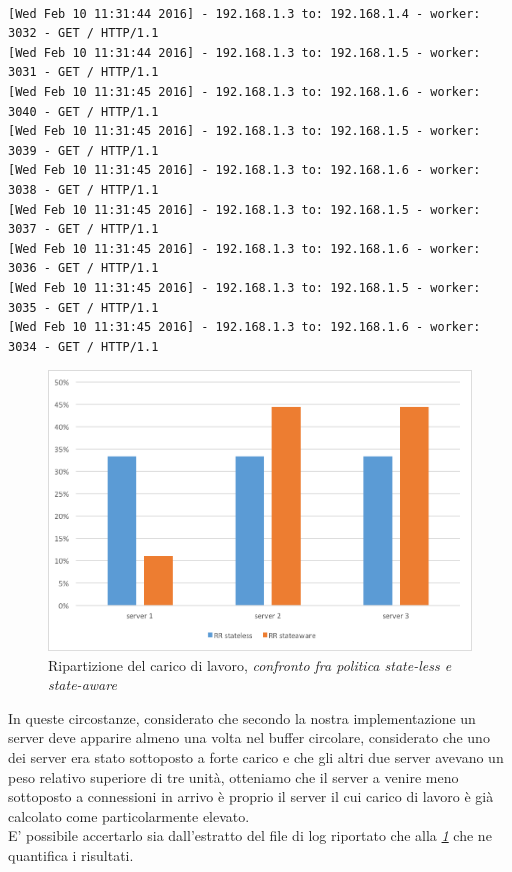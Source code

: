\documentclass[italian]{tktltiki2}
\begin{document}
\begin{lstlisting}[basicstyle=\fontsize{6.4}{7}\selectfont\ttfamily]

[Wed Feb 10 11:31:44 2016] - 192.168.1.3 to: 192.168.1.4 - worker: 3032 - GET / HTTP/1.1
[Wed Feb 10 11:31:44 2016] - 192.168.1.3 to: 192.168.1.5 - worker: 3031 - GET / HTTP/1.1
[Wed Feb 10 11:31:45 2016] - 192.168.1.3 to: 192.168.1.6 - worker: 3040 - GET / HTTP/1.1
[Wed Feb 10 11:31:45 2016] - 192.168.1.3 to: 192.168.1.5 - worker: 3039 - GET / HTTP/1.1
[Wed Feb 10 11:31:45 2016] - 192.168.1.3 to: 192.168.1.6 - worker: 3038 - GET / HTTP/1.1
[Wed Feb 10 11:31:45 2016] - 192.168.1.3 to: 192.168.1.5 - worker: 3037 - GET / HTTP/1.1
[Wed Feb 10 11:31:45 2016] - 192.168.1.3 to: 192.168.1.6 - worker: 3036 - GET / HTTP/1.1
[Wed Feb 10 11:31:45 2016] - 192.168.1.3 to: 192.168.1.5 - worker: 3035 - GET / HTTP/1.1
[Wed Feb 10 11:31:45 2016] - 192.168.1.3 to: 192.168.1.6 - worker: 3034 - GET / HTTP/1.1
\end{lstlisting}
\begin{figure}[H]
\centering
\includegraphics[width=\textwidth]{images/round_robin_cfr}
\caption{Ripartizione del carico di lavoro, \emph{confronto fra politica state-less e state-aware}\label{fig: rrobin_cfr}}
\end{figure}
In queste circostanze, considerato che secondo la nostra implementazione un server deve apparire almeno una volta nel buffer circolare, considerato che uno dei server era stato sottoposto a forte carico e che gli altri due server avevano un peso relativo superiore di tre unità, otteniamo che il server a venire meno sottoposto a connessioni in arrivo è proprio il server il cui carico di lavoro è già calcolato come particolarmente elevato. \\
E' possibile accertarlo sia dall'estratto del file di log riportato che alla \emph{\ref{fig: rrobin_cfr}} che ne quantifica i risultati.
\end{document}
